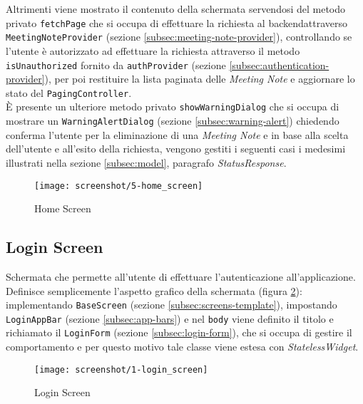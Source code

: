 Altrimenti viene mostrato il contenuto della schermata servendosi del metodo privato \lstinline{fetchPage} che si occupa di effettuare la richiesta al \gls{backend}\glsoccur attraverso \lstinline{MeetingNoteProvider} (sezione \ref{subsec:meeting-note-provider}), controllando se l'utente è autorizzato ad effettuare la richiesta attraverso il metodo \lstinline{isUnauthorized} fornito da \lstinline{authProvider} (sezione \ref{subsec:authentication-provider}), per poi restituire la lista paginata delle \emph{Meeting Note} e aggiornare lo stato del \lstinline{PagingController}. \\
È presente un ulteriore metodo privato \lstinline{showWarningDialog} che si occupa di mostrare un \lstinline{WarningAlertDialog} (sezione \ref{subsec:warning-alert}) chiedendo conferma l'utente per la eliminazione di una \emph{Meeting Note} e in base alla scelta dell'utente e all'esito della richiesta, vengono gestiti i seguenti casi {i medesimi illustrati nella sezione \ref{subsec:model}, paragrafo \emph{StatusResponse}}.

\begin{figure}[!h] 
    \centering 
    \texttt{[image: screenshot/5-home\_screen]}
    \caption{Home Screen}
    \label{fig:home-screen}
\end{figure}

\newpage

\subsection{Login Screen}
\label{subsec:login-screen}

Schermata che permette all'utente di effettuare l'autenticazione all'applicazione. \\
Definisce semplicemente l'aspetto grafico della schermata (figura \ref{fig:login-screen}): implementando \lstinline{BaseScreen} (sezione \ref{subsec:screens-template}), impostando \lstinline{LoginAppBar} (sezione \ref{subsec:app-bars}) e nel \lstinline{body} viene definito il titolo e richiamato il \lstinline{LoginForm} (sezione \ref{subsec:login-form}), che si occupa di gestire il comportamento e per questo motivo tale classe viene estesa con \emph{StatelessWidget}.

\begin{figure}[!h] 
    \centering 
    \texttt{[image: screenshot/1-login\_screen]} 
    \caption{Login Screen}
    \label{fig:login-screen}
\end{figure}

